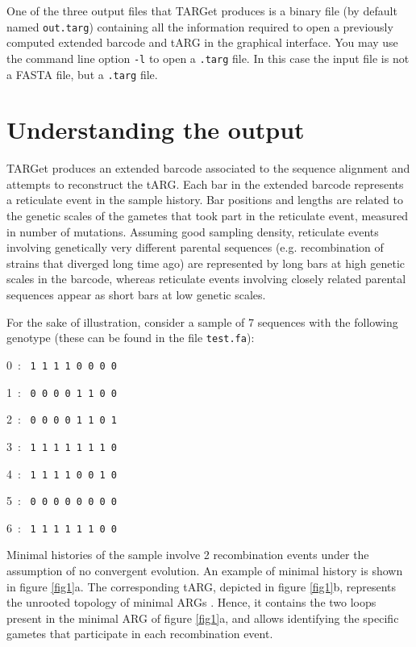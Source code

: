 \documentclass[12pt]{article}
\begin{document}
One of the three output files that TARGet produces is a binary file (by default named \texttt{out.targ}) containing all the information required to open a previously computed extended barcode and tARG in the graphical interface. You may use the command line option \texttt{-l} to open a \texttt{.targ} file. In this case the input file is not a FASTA file, but a \texttt{.targ} file.

\section{Understanding the output}

TARGet produces an extended barcode associated to the sequence alignment and attempts to reconstruct the tARG. Each bar in the extended barcode represents a reticulate event in the sample history. Bar positions and lengths are related to the genetic scales of the gametes that took part in the reticulate event, measured in number of mutations. Assuming good sampling density, reticulate events involving genetically very different parental sequences (e.g. recombination of strains that diverged long time ago) are represented by long bars at high genetic scales in the barcode, whereas reticulate events involving closely related parental sequences appear as short bars at low genetic scales.

For the sake of illustration, consider a sample of 7 sequences with the following genotype (these can be found in the file \texttt{test.fa}):

0\ : \ \texttt{1 1 1 1 0 0 0 0}

1\ : \ \texttt{0 0 0 0 1 1 0 0}

2\ : \ \texttt{0 0 0 0 1 1 0 1}

3\ : \ \texttt{1 1 1 1 1 1 1 0}

4\ : \ \texttt{1 1 1 1 0 0 1 0}

5\ : \ \texttt{0 0 0 0 0 0 0 0}

6\ : \ \texttt{1 1 1 1 1 1 0 0}

\noindent Minimal histories of the sample involve 2 recombination events under the assumption of no convergent evolution. An example of minimal history is shown in figure \ref{fig1}a. The corresponding tARG, depicted in figure \ref{fig1}b, represents the unrooted topology of minimal ARGs \cite{target}. Hence, it contains the two loops present in the minimal ARG of figure \ref{fig1}a, and allows identifying the specific gametes that participate in each recombination event. 
\end{document}
